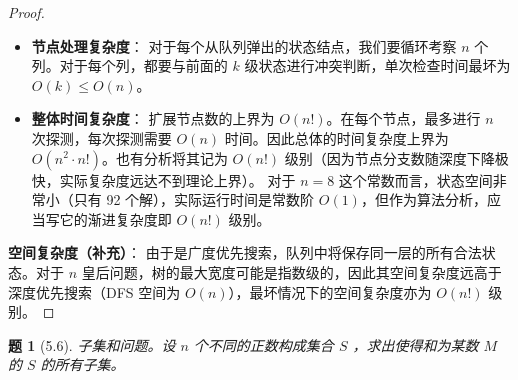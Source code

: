 \documentclass[11pt, a4paper]{article}
\newtheorem{problem}{题}
\begin{document}
\begin{proof}
\begin{itemize}
        \item \textbf{节点处理复杂度}：
        对于每个从队列弹出的状态结点，我们要循环考察 $n$ 个列。对于每个列，都要与前面的 $k$ 级状态进行冲突判断，单次检查时间最坏为 $O(k) \le O(n)$。
        
        \item \textbf{整体时间复杂度}：
        扩展节点数的上界为 $O(n!)$。在每个节点，最多进行 $n$ 次探测，每次探测需要 $O(n)$ 时间。因此总体的时间复杂度上界为 $O(n^2 \cdot n!)$。也有分析将其记为 $O(n!)$ 级别（因为节点分支数随深度下降极快，实际复杂度远达不到理论上界）。
        对于 $n=8$ 这个常数而言，状态空间非常小（只有 92 个解），实际运行时间是常数阶 $O(1)$，但作为算法分析，应当写它的渐进复杂度即 $O(n!)$ 级别。
    \end{itemize}

    \textbf{空间复杂度（补充）}：
    由于是广度优先搜索，队列中将保存同一层的所有合法状态。对于 $n$ 皇后问题，树的最大宽度可能是指数级的，因此其空间复杂度远高于深度优先搜索（DFS 空间为 $O(n)$），最坏情况下的空间复杂度亦为 $O(n!)$ 级别。
\end{proof}

\begin{problem}[5.6]
    子集和问题。设 $n$ 个不同的正数构成集合 $S$ ，求出使得和为某数 $M$ 的 $S$ 的所有子集。
\end{problem}
\end{document}
